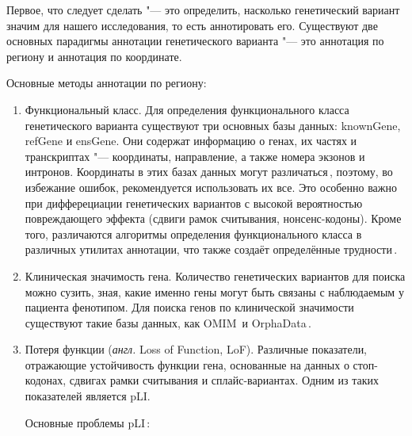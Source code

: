 \documentclass[a4paper,14pt]{extarticle}
\newcommand{\anglia}[1]{\textit{англ.} \textenglish{#1}}
\begin{document}
Первое, что следует сделать "--- это определить, насколько генетический вариант значим для нашего исследования, то есть аннотировать его.
Существуют две основных парадигмы аннотации генетического варианта "--- это аннотация по региону и аннотация по координате.

Основные методы аннотации по региону:

\begin{enumerate}
\item Функциональный класс.
Для определения функционального класса генетического варианта существуют три основных базы данных: knownGene, refGene и ensGene.
Они содержат информацию о генах, их частях и транскриптах "--- координаты, направление, а также номера экзонов и интронов.
Координаты в этих базах данных могут различаться\,\cite{McCarthy_2014}, поэтому, во избежание ошибок, рекомендуется использовать их все.
Это особенно важно при дифферециации генетических вариантов с высокой вероятностью повреждающего эффекта (сдвиги рамок считывания, нонсенс-кодоны).
Кроме того, различаются алгоритмы определения функционального класса в различных утилитах аннотации, что также создаёт определённые трудности\,\cite{Jesaitis_2014}.

\item Клиническая значимость гена.
Количество генетических вариантов для поиска можно сузить, зная, какие именно гены могут быть связаны с наблюдаемым у пациента фенотипом.
Для поиска генов по клинической значимости существуют такие базы данных, как OMIM\,\cite{Amberger_2014} и OrphaData\,\cite{Orphanet}.

\item Потеря функции (\anglia{Loss of Function, LoF}).
Различные показатели, отражающие устойчивость функции гена, основанные на данных о стоп-кодонах, сдвигах рамки считывания и сплайс-вариантах.
Одним из таких показателей является pLI.

Основные проблемы pLI\,\cite{Ziegler_2019}:


\end{enumerate}
\end{document}
